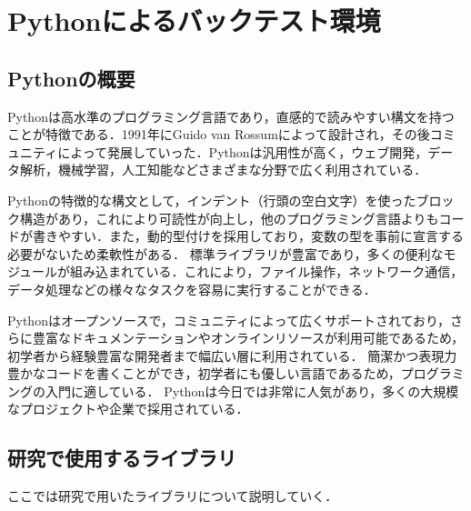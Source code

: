 \section{Pythonによるバックテスト環境}

\subsection{Pythonの概要}
Python\cite{pythontrading,pythonapp,van}は高水準のプログラミング言語であり，直感的で読みやすい構文を持つことが特徴である．1991年にGuido van Rossumによって設計され，その後コミュニティによって発展していった．Pythonは汎用性が高く，ウェブ開発，データ解析，機械学習，人工知能などさまざまな分野で広く利用されている．

Pythonの特徴的な構文として，インデント（行頭の空白文字）を使ったブロック構造があり，これにより可読性が向上し，他のプログラミング言語よりもコードが書きやすい．また，動的型付けを採用しており，変数の型を事前に宣言する必要がないため柔軟性がある．
標準ライブラリが豊富であり，多くの便利なモジュールが組み込まれている．これにより，ファイル操作，ネットワーク通信，データ処理などの様々なタスクを容易に実行することができる．

Pythonはオープンソースで，コミュニティによって広くサポートされており，さらに豊富なドキュメンテーションやオンラインリソースが利用可能であるため，初学者から経験豊富な開発者まで幅広い層に利用されている．
簡潔かつ表現力豊かなコードを書くことができ，初学者にも優しい言語であるため，プログラミングの入門に適している． Pythonは今日では非常に人気があり，多くの大規模なプロジェクトや企業で採用されている．


\subsection{研究で使用するライブラリ}
ここでは研究で用いたライブラリについて説明していく．


